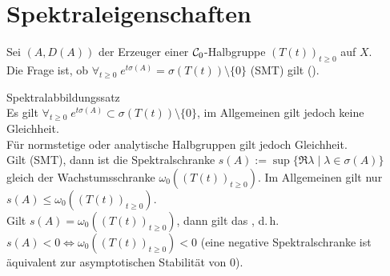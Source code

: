\pagebreak

\section{%
    Spektraleigenschaften%
}

\begin{Bem}
    Sei $(A, D(A))$ der Erzeuger einer $\mathcal{C}_0$-Halbgruppe $(T(t))_{t \ge 0}$ auf $X$.\\
    Die Frage ist, ob $\forall_{t \ge 0}\; e^{t \sigma(A)} = \sigma(T(t)) \setminus \{0\}$
    (SMT) gilt ().
\end{Bem}

\begin{Satz}{Spektralabbildungssatz}\\
    Es gilt $\forall_{t \ge 0}\; e^{t \sigma(A)} \subset \sigma(T(t)) \setminus \{0\}$,
    im Allgemeinen gilt jedoch keine Gleichheit.\\
    Für normstetige oder analytische Halbgruppen gilt jedoch Gleichheit.\\
    Gilt (SMT), dann ist die Spektralschranke
    $s(A) := \sup\{\Re \lambda \;|\; \lambda \in \sigma(A)\}$ gleich der Wachstumsschranke
    $\omega_0((T(t))_{t \ge 0})$.
    Im Allgemeinen gilt nur $s(A) \le \omega_0((T(t))_{t \ge 0})$.\\
    Gilt $s(A) = \omega_0((T(t))_{t \ge 0})$, dann gilt das
    , d.\,h.\\
    $s(A) < 0 \iff \omega_0((T(t))_{t \ge 0}) < 0$
    (eine negative Spektralschranke ist äquivalent zur asymptotischen Stabilität von $0$).
\end{Satz}

\pagebreak

